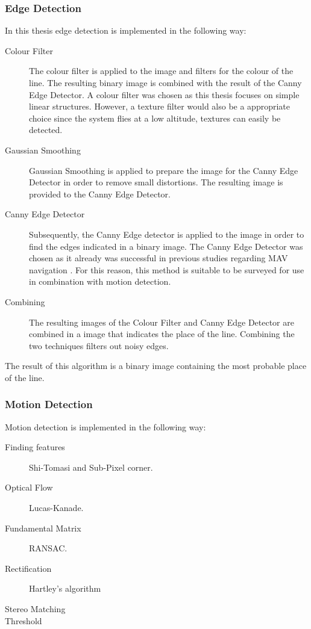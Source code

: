 \documentclass[a4paper]{article}
\begin{document}
\subsubsection{Edge Detection}
In this thesis edge detection is implemented in the following way:
\begin{description}
\item[Colour Filter] The colour filter is applied to the image and filters for the colour of the line. The resulting binary image is combined with the result of the Canny Edge Detector. A colour filter was chosen as this thesis focuses on simple linear structures. However, a texture filter would also be a appropriate choice since the system flies at a low altitude, textures can easily be detected.
\item[Gaussian Smoothing] Gaussian Smoothing is applied to prepare the image for the Canny Edge Detector in order to remove small distortions. The resulting image is provided to the Canny Edge Detector.
\item[Canny Edge Detector] Subsequently, the Canny Edge detector is applied to the image in order to find the edges indicated in a binary image. The Canny Edge Detector was chosen as it already was successful in previous studies regarding MAV navigation \cite{Bills2011}. For this reason, this method is suitable to be surveyed for use in combination with motion detection.
\item[Combining] The resulting images of the Colour Filter and Canny Edge Detector are combined in a image that indicates the place of the line. Combining the two techniques filters out noisy edges.
\end{description}
The result of this algorithm is a binary image containing the most probable place of the line.
\subsubsection{Motion Detection}
Motion detection is implemented in the following way:
\begin{description}
\item[Finding features] Shi-Tomasi and Sub-Pixel corner.
\item[Optical Flow] Lucas-Kanade.
\item[Fundamental Matrix] RANSAC.
\item[Rectification] Hartley's algorithm
\item[Stereo Matching]
\item[Threshold]
\end{description}
\end{document}
